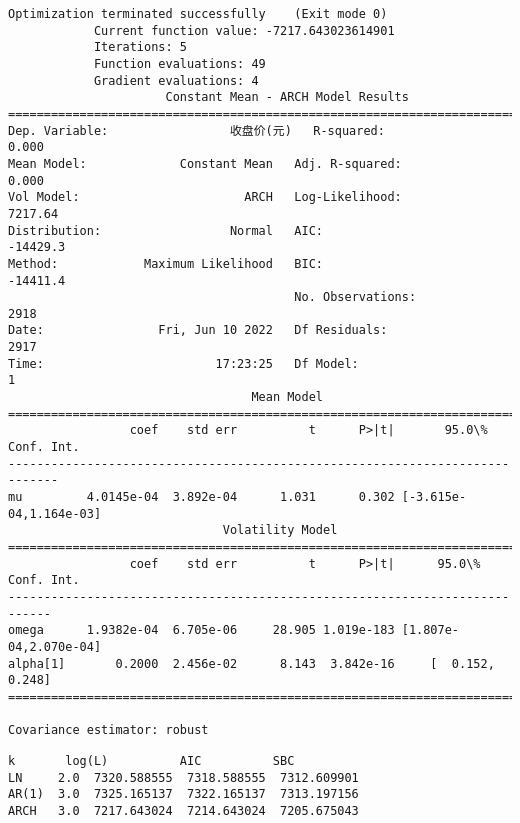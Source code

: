 \documentclass[11pt]{article}
\makeatletter
\newcommand{\boxspacing}{\kern\kvtcb@left@rule\kern\kvtcb@boxsep}
\newcommand{\prompt}[4]{
        {\ttfamily\llap{{\color{#2}[#3]:\hspace{3pt}#4}}\vspace{-\baselineskip}}
    }
\makeatother
\begin{document}
    \begin{Verbatim}[commandchars=\\\{\}]
Optimization terminated successfully    (Exit mode 0)
            Current function value: -7217.643023614901
            Iterations: 5
            Function evaluations: 49
            Gradient evaluations: 4
                      Constant Mean - ARCH Model Results
==============================================================================
Dep. Variable:                 收盘价(元)   R-squared:                       0.000
Mean Model:             Constant Mean   Adj. R-squared:                  0.000
Vol Model:                       ARCH   Log-Likelihood:                7217.64
Distribution:                  Normal   AIC:                          -14429.3
Method:            Maximum Likelihood   BIC:                          -14411.4
                                        No. Observations:                 2918
Date:                Fri, Jun 10 2022   Df Residuals:                     2917
Time:                        17:23:25   Df Model:                            1
                                  Mean Model
=============================================================================
                 coef    std err          t      P>|t|       95.0\% Conf. Int.
-----------------------------------------------------------------------------
mu         4.0145e-04  3.892e-04      1.031      0.302 [-3.615e-04,1.164e-03]
                              Volatility Model
============================================================================
                 coef    std err          t      P>|t|      95.0\% Conf. Int.
----------------------------------------------------------------------------
omega      1.9382e-04  6.705e-06     28.905 1.019e-183 [1.807e-04,2.070e-04]
alpha[1]       0.2000  2.456e-02      8.143  3.842e-16     [  0.152,  0.248]
============================================================================

Covariance estimator: robust
    \end{Verbatim}

            \begin{tcolorbox}[breakable, size=fbox, boxrule=.5pt, pad at break*=1mm, opacityfill=0]
\prompt{Out}{outcolor}{4}{\boxspacing}
\begin{Verbatim}[commandchars=\\\{\}]
         k       log(L)          AIC          SBC
LN     2.0  7320.588555  7318.588555  7312.609901
AR(1)  3.0  7325.165137  7322.165137  7313.197156
ARCH   3.0  7217.643024  7214.643024  7205.675043
\end{Verbatim}
\end{tcolorbox}
\end{document}
